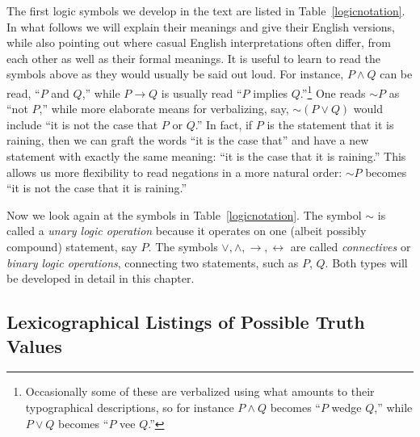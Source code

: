 The first logic symbols we develop in the text are listed in
Table~\ref{logicnotation}.
In what follows we will 
explain their meanings and give
their English versions, while also pointing out
where casual English interpretations often differ,
from each other as well as their formal meanings.
It is useful to learn to read the symbols above as they would
usually be said out loud.  For instance, $P\wedge Q$ can be read,
``$P$ and $Q$,'' while $P\longrightarrow Q$ is usually  
read ``$P$ implies $Q$.''\footnote{%
Occasionally some of these are
verbalized using what amounts to their typographical
descriptions, so for instance $P\wedge Q$ becomes ``$P$ wedge $Q$,''
while $P\vee Q$ becomes ``$P$ vee $Q$.''}
One reads $\sim P$ as ``not $P$,'' while more elaborate
means for verbalizing, say, $\sim(P\vee Q)$ would include
``it is not the case that $P$ or $Q$.''
In fact, if $P$ is the statement that it is raining, 
then  we can graft the words ``it is the case that'' and
have a new statement with exactly the same meaning:
``it is the case that it is raining.''  This allows us more
flexibility to read negations in a more natural order:
$\sim P$ becomes ``it is not the case that it is raining.''

Now we look again at the symbols in Table~\ref{logicnotation}.
The symbol $\sim$ is called a {\it unary logic operation}
because it operates on one (albeit possibly compound) statement,
say $P$.
 The symbols $\vee,\wedge,\longrightarrow,
\longleftrightarrow$ are called {\it connectives} or
{\it binary logic operations}, connecting two
statements, such as $P$, $Q$. 
Both types will be developed in detail
in this chapter.


\subsection{Lexicographical Listings of Possible Truth Values}

